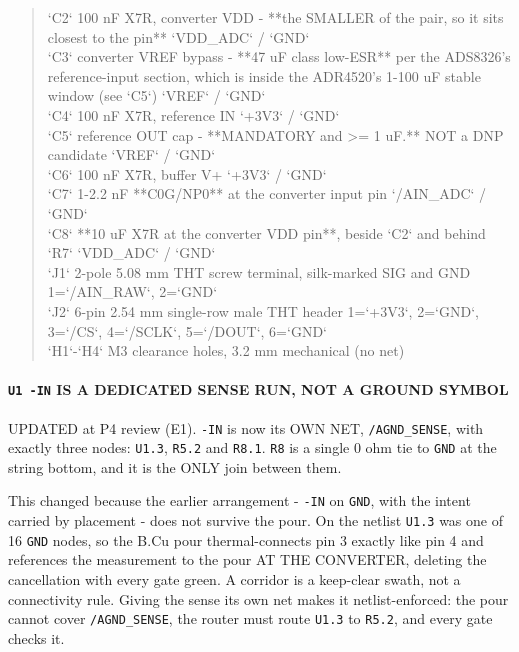 \documentclass[11pt,a4paper]{article}
\begin{document}
\begin{quote}
\textbar{} `C2` \textbar{} 100 nF X7R, converter VDD - {*}{*}the SMALLER of the pair, so it sits closest to the pin{*}{*} \textbar{} `VDD\_ADC` / `GND` \textbar{}\\
\textbar{} `C3` \textbar{} converter VREF bypass - {*}{*}47 uF class low-ESR{*}{*} per the ADS8326's reference-input section, which is inside the ADR4520's 1-100 uF stable window (see `C5`) \textbar{} `VREF` / `GND` \textbar{}\\
\textbar{} `C4` \textbar{} 100 nF X7R, reference IN \textbar{} `+3V3` / `GND` \textbar{}\\
\textbar{} `C5` \textbar{} reference OUT cap - {*}{*}MANDATORY and \textgreater{}= 1 uF.{*}{*} NOT a DNP candidate \textbar{} `VREF` / `GND` \textbar{}\\
\textbar{} `C6` \textbar{} 100 nF X7R, buffer V+ \textbar{} `+3V3` / `GND` \textbar{}\\
\textbar{} `C7` \textbar{} 1-2.2 nF {*}{*}C0G/NP0{*}{*} at the converter input pin \textbar{} `/AIN\_ADC` / `GND` \textbar{}\\
\textbar{} `C8` \textbar{} {*}{*}10 uF X7R at the converter VDD pin{*}{*}, beside `C2` and behind `R7` \textbar{} `VDD\_ADC` / `GND` \textbar{}\\
\textbar{} `J1` \textbar{} 2-pole 5.08 mm THT screw terminal, silk-marked SIG and GND \textbar{} 1=`/AIN\_RAW`, 2=`GND` \textbar{}\\
\textbar{} `J2` \textbar{} 6-pin 2.54 mm single-row male THT header \textbar{} 1=`+3V3`, 2=`GND`, 3=`/CS`, 4=`/SCLK`, 5=`/DOUT`, 6=`GND` \textbar{}\\
\textbar{} `H1`-`H4` \textbar{} M3 clearance holes, 3.2 mm \textbar{} mechanical (no net) \textbar{}
\end{quote}
\paragraph*{\texttt{U1 -IN} IS A DEDICATED SENSE RUN, NOT A GROUND SYMBOL}
UPDATED at P4 review (E1). \texttt{-IN} is now its OWN NET, \texttt{/AGND\_SENSE}, with exactly three nodes: \texttt{U1.3}, \texttt{R5.2} and \texttt{R8.1}. \texttt{R8} is a single 0 ohm tie to \texttt{GND} at the string bottom, and it is the ONLY join between them.

This changed because the earlier arrangement - \texttt{-IN} on \texttt{GND}, with the intent carried by placement - does not survive the pour. On the netlist \texttt{U1.3} was one of 16 \texttt{GND} nodes, so the B.Cu pour thermal-connects pin 3 exactly like pin 4 and references the measurement to the pour AT THE CONVERTER, deleting the cancellation with every gate green. A corridor is a keep-clear swath, not a connectivity rule. Giving the sense its own net makes it netlist-enforced: the pour cannot cover \texttt{/AGND\_SENSE}, the router must route \texttt{U1.3} to \texttt{R5.2}, and every gate checks it.
\end{document}
